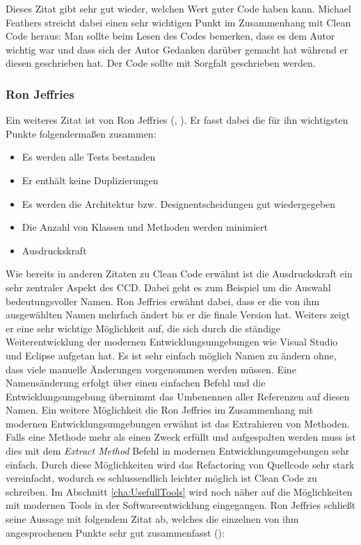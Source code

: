 Dieses Zitat gibt sehr gut wieder, welchen Wert guter Code haben kann. Michael Feathers streicht dabei einen sehr wichtigen Punkt im Zusammenhang mit Clean Code heraus: Man sollte beim Lesen des Codes bemerken, dass es dem Autor wichtig war und dass sich der Autor Gedanken darüber gemacht hat während er diesen geschrieben hat. Der Code sollte mit Sorgfalt geschrieben werden.

\subsubsection{Ron Jeffries}
Ein weiteres Zitat ist von Ron Jeffries (\cite{Jeffries2000}, \cite{Jeffries2004}). Er fasst dabei die für ihn wichtigsten Punkte folgendermaßen zusammen:

\begin{itemize}
	\item Es werden alle Tests bestanden
	\item Er enthält keine Duplizierungen
	\item Es werden die Architektur bzw. Designentscheidungen gut wiedergegeben
	\item Die Anzahl von Klassen und Methoden werden minimiert
	\item Ausdruckskraft
\end{itemize}

Wie bereits in anderen Zitaten zu Clean Code erwähnt ist die Ausdruckskraft ein sehr zentraler Aspekt des CCD. Dabei geht es zum Beispiel um die Auswahl bedeutungsvoller Namen. Ron Jeffries erwähnt dabei, dass er die von ihm ausgewählten Namen mehrfach ändert bis er die finale Version hat. Weiters zeigt er eine sehr wichtige Möglichkeit auf, die sich durch die ständige Weiterentwicklung der modernen Entwicklungsumgebungen wie Visual Studio und Eclipse aufgetan hat. Es ist sehr einfach möglich Namen zu ändern ohne, dass viele manuelle Änderungen vorgenommen werden müssen. Eine Namensänderung erfolgt über einen einfachen Befehl und die Entwicklungsumgebung übernimmt das Umbenennen aller Referenzen auf diesen Namen. Ein weitere Möglichkeit die Ron Jeffries im Zusammenhang mit modernen Entwicklungsumgebungen erwähnt ist das Extrahieren von Methoden. Falls eine Methode mehr als einen Zweck erfüllt und aufgespalten werden muss ist dies mit dem \textit{Extract Method} Befehl in modernen Entwicklungsumgebungen sehr einfach. Durch diese Möglichkeiten wird das Refactoring von Quellcode sehr stark vereinfacht, wodurch es schlussendlich leichter möglich ist Clean Code zu schreiben. Im Abschnitt \ref{cha:UsefullTools} wird noch näher auf die Möglichkeiten mit modernen Tools in der Softwareentwicklung eingegangen. Ron Jeffries schließt seine Aussage mit folgendem Zitat ab, welches die einzelnen von ihm angesprochenen Punkte sehr gut zusammenfasst (\cite[Seite 38]{Martin2008}):

